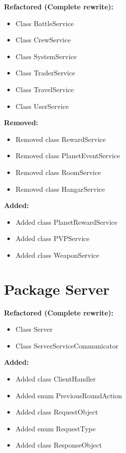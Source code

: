 \documentclass{article}
\begin{document}
\textbf{Refactored (Complete rewrite):}
\begin{itemize}
\item Class BattleService
\item Class CrewService
\item Class SystemService
\item Class TraderService
\item Class TravelService
\item Class UserService
\end{itemize}

\textbf{Removed:}
\begin{itemize}
\item Removed class RewardService
\item Removed class PlanetEventService
\item Removed class RoomService
\item Removed class HangarService
\end{itemize}

\textbf{Added:}
\begin{itemize}
\item Added class PlanetRewardService
\item Added class PVPService
\item Added class WeaponService
\end{itemize}


\section{Package Server}

\textbf{Refactored (Complete rewrite):}
\begin{itemize}
\item Class Server
\item Class ServerServiceCommunicator
\end{itemize}

\textbf{Added:}
\begin{itemize}
\item Added class ClientHandler
\item Added enum PreviousRoundAction
\item Added class RequestObject
\item Added enum RequestType
\item Added class ResponseObject
\end{itemize}
\end{document}
